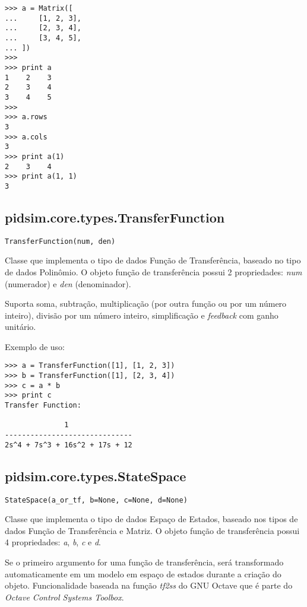     \begin{verbatim}
>>> a = Matrix([
...     [1, 2, 3],
...     [2, 3, 4],
...     [3, 4, 5],
... ])
>>>
>>> print a
1    2    3
2    3    4
3    4    5
>>>
>>> a.rows
3
>>> a.cols
3
>>> print a(1)
2    3    4
>>> print a(1, 1)
3\end{verbatim}

\subsection{pidsim.core.types.TransferFunction}

    \begin{verbatim}
TransferFunction(num, den)\end{verbatim}

    Classe que implementa o tipo de dados Função de Transferência, baseado
    no tipo de dados Polinômio. O objeto função de transferência possui
    2 propriedades: \textit{num} (numerador) e \textit{den} (denominador).
    
    Suporta soma, subtração, multiplicação (por outra função ou por um
    número inteiro), divisão por um número inteiro, simplificação e
    \textit{feedback} com ganho unitário.
    
    Exemplo de uso:
    
    \begin{verbatim}
>>> a = TransferFunction([1], [1, 2, 3])
>>> b = TransferFunction([1], [2, 3, 4])
>>> c = a * b
>>> print c
Transfer Function:

              1               
------------------------------
2s^4 + 7s^3 + 16s^2 + 17s + 12\end{verbatim}

\subsection{pidsim.core.types.StateSpace}

    \begin{verbatim}
StateSpace(a_or_tf, b=None, c=None, d=None)
    \end{verbatim}

    Classe que implementa o tipo de dados Espaço de Estados, baseado
    nos tipos de dados Função de Transferência e Matriz. O objeto função
    de transferência possui 4 propriedades: \textit{a}, \textit{b},
    \textit{c} e \textit{d}.
    
    Se o primeiro argumento for uma função de transferência, será transformado
    automaticamente em um modelo em espaço de estados durante a criação do
    objeto. Funcionalidade baseada na função \textit{tf2ss} do GNU Octave
    que é parte do \textit{Octave Control Systems Toolbox}.
    
